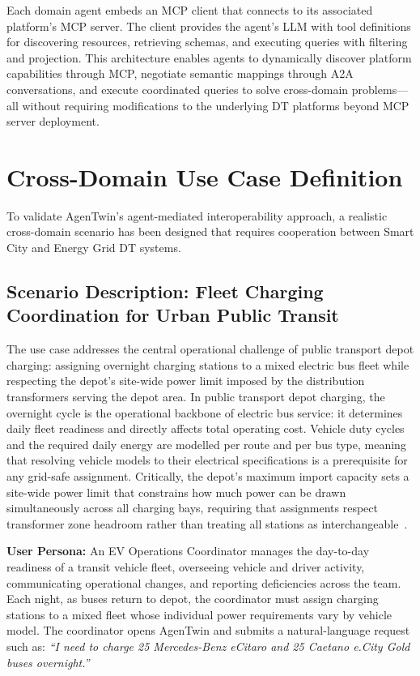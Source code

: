 Each domain agent embeds an MCP client
    that connects to its associated platform's MCP server.
The client provides the agent's LLM with tool definitions for
    discovering resources,
    retrieving schemas, and
    executing queries with filtering and projection.
This architecture enables agents to dynamically discover platform capabilities through MCP,
    negotiate semantic mappings through A2A conversations, and
    execute coordinated queries to solve cross-domain problems---all
    without requiring modifications to the underlying DT platforms beyond MCP server deployment.

\section{Cross-Domain Use Case Definition}
\label{sec:use-case}

To validate AgenTwin's agent-mediated interoperability approach,
    a realistic cross-domain scenario has been designed that requires
    cooperation between Smart City and Energy Grid DT systems.

\subsection{Scenario Description: Fleet Charging Coordination for Urban Public Transit}
\label{subsec:scenario-description}

The use case addresses the central operational challenge of public transport depot charging:
    assigning overnight charging stations to a mixed electric bus fleet
    while respecting the depot's site-wide power limit imposed by
    the distribution transformers serving the depot area.
In public transport depot charging,
    the overnight cycle is the operational backbone of electric bus service:
    it determines daily fleet readiness and directly affects total operating cost.
Vehicle duty cycles and the required daily energy are modelled per route and per bus type,
    meaning that resolving vehicle models to their electrical specifications
    is a prerequisite for any grid-safe assignment.
Critically, the depot's maximum import capacity sets a site-wide power limit
    that constrains how much power can be drawn simultaneously across all charging bays,
    requiring that assignments respect transformer zone headroom
    rather than treating all stations as interchangeable~\cite{elintacharge2026}.

\textbf{User Persona:} %
An EV Operations Coordinator manages the day-to-day readiness of a transit vehicle fleet,
    overseeing vehicle and driver activity, communicating operational changes,
    and reporting deficiencies across the team.
Each night, as buses return to depot, the coordinator must assign charging stations
    to a mixed fleet whose individual power requirements vary by vehicle model.
The coordinator opens AgenTwin and submits a natural-language request such as:
    \textit{``I need to charge 25 Mercedes-Benz eCitaro and 25 Caetano e.City Gold buses overnight.''}

